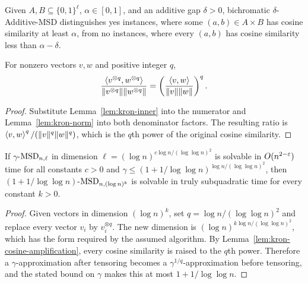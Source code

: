 \begin{definition}
  \label{def:additive-bichromatic-msd}
  Given $A,B\subseteq\{0,1\}^{\ell}$, $\alpha\in[0,1]$, and an additive gap
  $\delta>0$, bichromatic $\delta$-Additive-MSD distinguishes yes instances,
  where some $(a,b)\in A\times B$ has cosine similarity at least $\alpha$, from
  no instances, where every $(a,b)$ has cosine similarity less than
  $\alpha-\delta$.
\end{definition}

\begin{lemma}
  \label{lem:kron-cosine-amplification}
  For nonzero vectors $v,w$ and positive integer $q$,
  \[
    \frac{\left\langle v^{\otimes q},w^{\otimes q}\right\rangle}
         {\|v^{\otimes q}\|\|w^{\otimes q}\|}
    =
    \left(\frac{\left\langle v,w\right\rangle}{\|v\|\|w\|}\right)^q .
  \]
\end{lemma}
\begin{proof}
  Substitute Lemma~\ref{lem:kron-inner} into the numerator and
  Lemma~\ref{lem:kron-norm} into both denominator factors.  The resulting ratio
  is $\left\langle v,w\right\rangle^q/(\|v\|^q\|w\|^q)$, which is the $q$th power of the original
  cosine similarity.
\end{proof}

\begin{lemma}
  \label{lem:msd-tensor-boost}
  If $\gamma$-$\mathrm{MSD}_{n,\ell}$ in dimension
  $\ell=(\log n)^{c\log n/(\log\log n)^2}$ is solvable in $O(n^{2-\varepsilon})$ time
  for all constants $c>0$ and
  $\gamma\leq(1+1/\log\log n)^{\log n/(\log\log n)^2}$, then
  $(1+1/\log\log n)$-$\mathrm{MSD}_{n,(\log n)^k}$ is solvable in truly subquadratic
  time for every constant $k>0$.
\end{lemma}
\begin{proof}
  Given vectors in dimension $(\log n)^k$, set
  $q=\log n/(\log\log n)^2$ and replace every vector $v_i$ by
  $v_i^{\otimes q}$.  The new dimension is
  $(\log n)^{k\log n/(\log\log n)^2}$, which has the form required by the
  assumed algorithm.  By Lemma~\ref{lem:kron-cosine-amplification}, every cosine
  similarity is raised to the $q$th power.  Therefore a $\gamma$-approximation
  after tensoring becomes a $\gamma^{1/q}$-approximation before tensoring, and
  the stated bound on $\gamma$ makes this at most $1+1/\log\log n$.
\end{proof}

